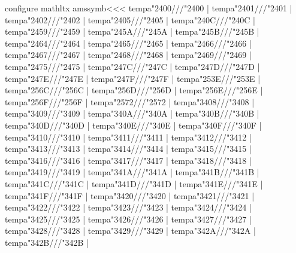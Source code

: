 {{\<configure mathltx amssymb\><<<
\def\:tempa#1"#2#3///{\Configure{MathClass}{#2}}
\def\:temp#1{\:tempa#1///{}{}{}{#1}}
\:temp{\mathchar"2400} |%
\:temp{\mathchar"2401} |%
\:temp{\mathchar"2402} |%
\:temp{\mathchar"2405} |%
\:temp{\mathchar"240C} |%
\:temp{\mathchar"2459} |%
\:temp{\mathchar"245A} |%
\:temp{\mathchar"245B} |%
\:temp{\mathchar"2464} |%
\:temp{\mathchar"2465} |%
\:temp{\mathchar"2466} |%
\:temp{\mathchar"2467} |%
\:temp{\mathchar"2468} |%
\:temp{\mathchar"2469} |%
\:temp{\mathchar"2475} |%
\:temp{\mathchar"247C} |%
\:temp{\mathchar"247D} |%
\:temp{\mathchar"247E} |%
\:temp{\mathchar"247F} |%
\:temp{\mathchar"253E} |%
\:temp{\mathchar"256C} |%
\:temp{\mathchar"256D} |%
\:temp{\mathchar"256E} |%
\:temp{\mathchar"256F} |%
\:temp{\mathchar"2572} |%
\:temp{\mathchar"3408} |%
\:temp{\mathchar"3409} |%
\:temp{\mathchar"340A} |%
\:temp{\mathchar"340B} |%
\:temp{\mathchar"340D} |%
\:temp{\mathchar"340E} |%
\:temp{\mathchar"340F} |%
\:temp{\mathchar"3410} |%
\:temp{\mathchar"3411} |%
\:temp{\mathchar"3412} |%
\:temp{\mathchar"3413} |%
\:temp{\mathchar"3414} |%
\:temp{\mathchar"3415} |%
\:temp{\mathchar"3416} |%
\:temp{\mathchar"3417} |%
\:temp{\mathchar"3418} |%
\:temp{\mathchar"3419} |%
\:temp{\mathchar"341A} |%
\:temp{\mathchar"341B} |%
\:temp{\mathchar"341C} |%
\:temp{\mathchar"341D} |%
\:temp{\mathchar"341E} |%
\:temp{\mathchar"341F} |%
\:temp{\mathchar"3420} |%
\:temp{\mathchar"3421} |%
\:temp{\mathchar"3422} |%
\:temp{\mathchar"3423} |%
\:temp{\mathchar"3424} |%
\:temp{\mathchar"3425} |%
\:temp{\mathchar"3426} |%
\:temp{\mathchar"3427} |%
\:temp{\mathchar"3428} |%
\:temp{\mathchar"3429} |%
\:temp{\mathchar"342A} |%
\:temp{\mathchar"342B} |%
}}
